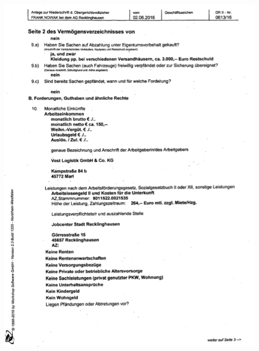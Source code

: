 \bigskip\noindent
\begin{minipage}{\textwidth}
  \centering
  \includegraphics{img/VVformular_teil2.PNG}
\end{minipage}

